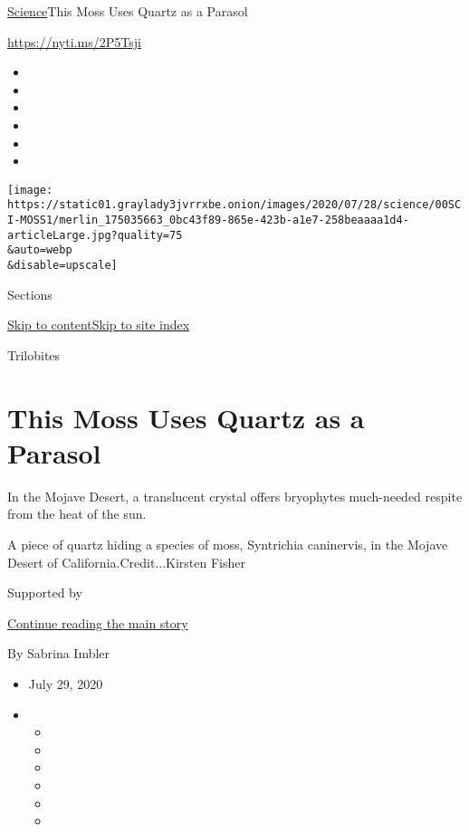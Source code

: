 \href{/section/science}{Science}\textbar{}This Moss Uses Quartz as a
Parasol

\url{https://nyti.ms/2P5Tsji}

\begin{itemize}
\item
\item
\item
\item
\item
\item
\end{itemize}

\texttt{[image: https://static01.graylady3jvrrxbe.onion/images/2020/07/28/science/00SCI-MOSS1/merlin\_175035663\_0bc43f89-865e-423b-a1e7-258beaaaa1d4-articleLarge.jpg?quality=75\\\&auto=webp\\\&disable=upscale]}

Sections

\protect\hyperlink{site-content}{Skip to
content}\protect\hyperlink{site-index}{Skip to site index}

Trilobites

\hypertarget{this-moss-uses-quartz-as-a-parasol}{%
\section{This Moss Uses Quartz as a
Parasol}\label{this-moss-uses-quartz-as-a-parasol}}

In the Mojave Desert, a translucent crystal offers bryophytes
much-needed respite from the heat of the sun.

A piece of quartz hiding a species of moss, Syntrichia caninervis, in
the Mojave Desert of California.Credit...Kirsten Fisher

Supported by

\protect\hyperlink{after-sponsor}{Continue reading the main story}

By Sabrina Imbler

\begin{itemize}
\item
  July 29, 2020
\item
  \begin{itemize}
  \item
  \item
  \item
  \item
  \item
  \item
  \end{itemize}
\end{itemize}

